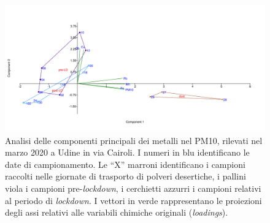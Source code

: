 \begin{landscape}
\begin{figure}
    \centering
    \includegraphics[width=0.9\linewidth]{figs/pca-metalli.pdf}
    \caption[PCA dei metalli nel PM10 a Udine]{Analisi delle componenti principali dei metalli nel PM10, rilevati nel marzo 2020 a Udine in via Cairoli. I numeri in blu identificano le date di campionamento. Le “X” marroni identificano i campioni raccolti nelle giornate di trasporto di polveri desertiche, i pallini viola i campioni pre-\textit{lockdown}, i cerchietti azzurri i campioni relativi al periodo di \textit{lockdown}. I vettori in verde rappresentano le proiezioni degli assi relativi alle variabili chimiche originali (\textit{loadings}).}
    \label{fig:metalli2}
\end{figure}
\end{landscape}

